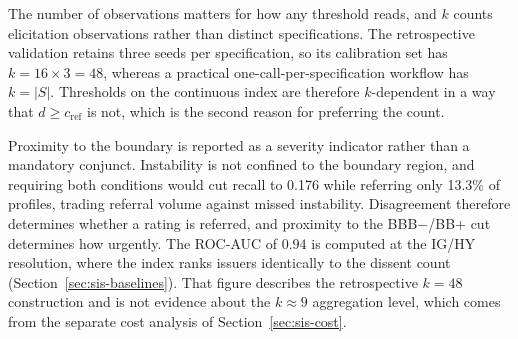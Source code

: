 \documentclass[a4paper,fleqn]{cas-sc}
\begin{document}
The number of observations matters for how any threshold reads, and $k$ counts elicitation
observations rather than distinct specifications. The retrospective validation retains three seeds
per specification, so its calibration set has $k=16\times3=48$, whereas a practical
one-call-per-specification workflow has $k=|S|$. Thresholds on the continuous index are therefore
$k$-dependent in a way that $d\ge c_{\mathrm{ref}}$ is not, which is the second reason for preferring the count.

Proximity to the boundary is reported as a severity indicator rather than a mandatory conjunct.
Instability is not confined to the boundary region, and requiring both conditions would cut recall
to 0.176 while referring only 13.3\% of profiles, trading referral volume against missed
instability. Disagreement therefore determines whether a rating is referred, and proximity to the
BBB$-$/BB$+$ cut determines how urgently. The ROC-AUC of $0.94$ is computed at the IG/HY
resolution, where the index ranks issuers identically to the dissent count
(Section~\ref{sec:sis-baselines}). That figure describes the retrospective $k=48$ construction and is not evidence about the
$k\approx9$ aggregation level, which comes from the separate cost analysis of
Section~\ref{sec:sis-cost}.
\end{document}
